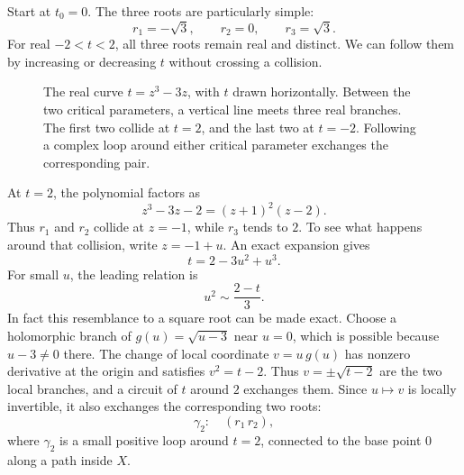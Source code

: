 Start at \(t_0=0\). The three roots are particularly simple:
\[
 r_1=-\sqrt3,\qquad r_2=0,\qquad r_3=\sqrt3.
\]
For real \(-2<t<2\), all three roots remain real and distinct. We can follow them by increasing or decreasing \(t\) without crossing a collision.

\begin{figure}[htbp]
\centering
{}
\caption{The real curve \(t=z^3-3z\), with \(t\) drawn horizontally. Between the two critical parameters, a vertical line meets three real branches. The first two collide at \(t=2\), and the last two at \(t=-2\). Following a complex loop around either critical parameter exchanges the corresponding pair.}
\label{fig:N20261030-cubic}
\end{figure}

At \(t=2\), the polynomial factors as
\[
 z^3-3z-2=(z+1)^2(z-2).
\]
Thus \(r_1\) and \(r_2\) collide at \(z=-1\), while \(r_3\) tends to \(2\). To see what happens around that collision, write \(z=-1+u\). An exact expansion gives
\begin{equation}
 t=2-3u^2+u^3.
 \label{eq:N20261030-localplus}
\end{equation}
For small \(u\), the leading relation is
\[
 u^2\sim\frac{2-t}{3}.
\]
In fact this resemblance to a square root can be made exact. Choose a holomorphic branch of \(g(u)=\sqrt{u-3}\) near \(u=0\), which is possible because \(u-3\ne0\) there. The change of local coordinate \(v=u\,g(u)\) has nonzero derivative at the origin and satisfies \(v^2=t-2\). Thus \(v=\pm\sqrt{t-2}\) are the two local branches, and a circuit of \(t\) around \(2\) exchanges them. Since \(u\mapsto v\) is locally invertible, it also exchanges the corresponding two roots:
\[
 \gamma_2:\quad(r_1\,r_2),
\]
where \(\gamma_2\) is a small positive loop around \(t=2\), connected to the base point \(0\) along a path inside \(X\).

